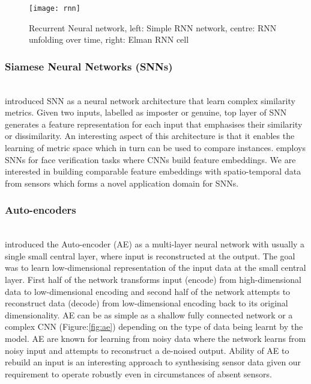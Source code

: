 \begin{figure}[ht]
\centering
\texttt{[image: rnn]}
\caption{Recurrent Neural network, left: Simple RNN network, centre: RNN unfolding over time, right: Elman RNN cell}
\label{fig:rnn}
\end{figure} 

\subsubsection{Siamese Neural Networks (SNNs)} \mbox{}\\
 introduced SNN as a neural network architecture that learn complex similarity metrics. Given two inputs, labelled as imposter or genuine, top layer of SNN generates a feature representation for each input that emphasises their similarity or dissimilarity. An interesting aspect of this architecture is that it enables the learning of metric space which in turn can be used to compare instances.  employs SNNs for face verification tasks where CNNs build feature embeddings. We are interested in building comparable feature embeddings with spatio-temporal data from sensors which forms a novel application domain for SNNs.

\subsubsection{Auto-encoders} \mbox{}\\
 introduced the Auto-encoder (AE) as a multi-layer neural network with usually a single small central layer, where input is reconstructed at the output. The goal was to learn low-dimensional representation of the input data at the small central layer. First half of the network transforms input (encode) from high-dimensional data to low-dimensional encoding and second half of the network attempts to reconstruct data (decode) from low-dimensional encoding back to its original dimensionality. AE can be as simple as a shallow fully connected network or a complex CNN (Figure:\ref{fig:ae}) depending on the type of data being learnt by the model.
AE are known for learning from noisy data \cite{vincent2010stacked} where the network learns from noisy input and attempts to reconstruct a de-noised output. Ability of AE to rebuild an input is an interesting approach to synthesising sensor data given our requirement to operate robustly even in circumstances of absent sensors.

